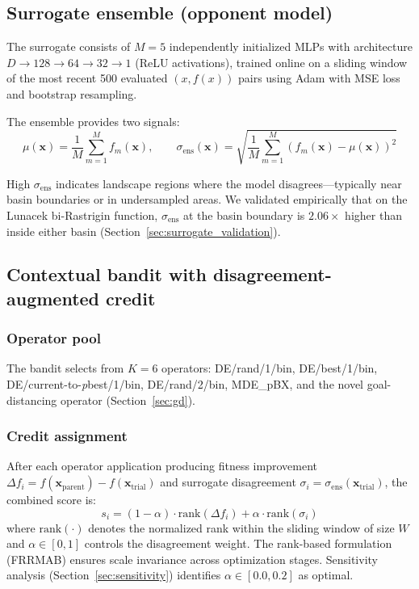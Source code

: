 \documentclass[preprint,12pt,authoryear]{elsarticle}
\newcommand{\sigmaens}{\sigma_{\text{ens}}}
\begin{document}
\subsection{Surrogate ensemble (opponent model)}
\label{sec:surrogate}

The surrogate consists of $M = 5$ independently initialized MLPs with architecture $D \to 128 \to 64 \to 32 \to 1$ (ReLU activations), trained online on a sliding window of the most recent 500 evaluated $(x, f(x))$ pairs using Adam with MSE loss and bootstrap resampling.

The ensemble provides two signals:
\begin{equation}
\mu(\mathbf{x}) = \frac{1}{M} \sum_{m=1}^{M} f_m(\mathbf{x}), \qquad
\sigmaens(\mathbf{x}) = \sqrt{\frac{1}{M} \sum_{m=1}^{M} \left(f_m(\mathbf{x}) - \mu(\mathbf{x})\right)^2}
\label{eq:ensemble}
\end{equation}

High $\sigmaens$ indicates landscape regions where the model disagrees---typically near basin boundaries or in undersampled areas. We validated empirically that on the Lunacek bi-Rastrigin function, $\sigmaens$ at the basin boundary is $2.06\times$ higher than inside either basin (Section~\ref{sec:surrogate_validation}).

\subsection{Contextual bandit with disagreement-augmented credit}
\label{sec:bandit}

\subsubsection{Operator pool}

The bandit selects from $K = 6$ operators: DE/rand/1/bin, DE/best/1/bin, DE/current-to-\emph{p}best/1/bin, DE/rand/2/bin, MDE\_pBX, and the novel goal-distancing operator (Section~\ref{sec:gd}).

\subsubsection{Credit assignment}

After each operator application producing fitness improvement $\Delta f_i = f(\mathbf{x}_{\text{parent}}) - f(\mathbf{x}_{\text{trial}})$ and surrogate disagreement $\sigma_i = \sigmaens(\mathbf{x}_{\text{trial}})$, the combined score is:
\begin{equation}
s_i = (1 - \alpha) \cdot \text{rank}(\Delta f_i) + \alpha \cdot \text{rank}(\sigma_i)
\label{eq:credit}
\end{equation}
where $\text{rank}(\cdot)$ denotes the normalized rank within the sliding window of size $W$ and $\alpha \in [0, 1]$ controls the disagreement weight. The rank-based formulation (FRRMAB) ensures scale invariance across optimization stages. Sensitivity analysis (Section~\ref{sec:sensitivity}) identifies $\alpha \in [0.0, 0.2]$ as optimal.
\end{document}
